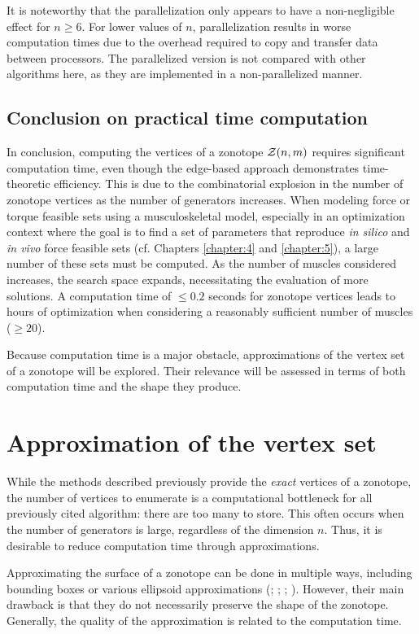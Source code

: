 It is noteworthy that the parallelization only appears to have a non-negligible effect for $n\geq 6$. For lower values of $n$, parallelization results in worse computation times due to the overhead required to copy and transfer data between processors. The parallelized version is not compared with other algorithms here, as they are implemented in a non-parallelized manner.

\subsection{Conclusion on practical time computation}
In conclusion, computing the vertices of a zonotope $\mathcal{Z}(n,m)$ requires significant computation time, even though the edge-based approach demonstrates time-theoretic efficiency. This is due to the combinatorial explosion in the number of zonotope vertices as the number of generators increases. When modeling force or torque feasible sets using a musculoskeletal model, especially in an optimization context where the goal is to find a set of parameters that reproduce \emph{in silico} and \emph{in vivo} force feasible sets (cf. Chapters \ref{chapter:4} and \ref{chapter:5}), a large number of these sets must be computed. As the number of muscles considered increases, the search space expands, necessitating the evaluation of more solutions. A computation time of $\leq 0.2$ seconds for zonotope vertices leads to hours of optimization when considering a reasonably sufficient number of muscles ($\geq 20$).

Because computation time is a major obstacle, approximations of the vertex set of a zonotope will be explored. Their relevance will be assessed in terms of both computation time and the shape they produce.

\section{Approximation of the vertex set}
\label{sec:approximation_of_vertices_zonotope}
While the methods described previously provide the \emph{exact} vertices of a zonotope, the number of vertices to enumerate is a computational bottleneck for all previously cited algorithm: there are too many to store. This often occurs when the number of generators is large, regardless of the dimension $n$. Thus, it is desirable to reduce computation time through approximations.

Approximating the surface of a zonotope can be done in multiple ways, including bounding boxes or various ellipsoid approximations (\cite{cernyGoffinAlgorithmZonotopes2012}; \cite{gasmannScalableZonotopeEllipsoidConversions2020}; \cite{kousikEllipsotopesCombiningEllipsoids2021}; \cite{henkLownerJohnEllipsoids2012}). However, their main drawback is that they do not necessarily preserve the shape of the zonotope. Generally, the quality of the approximation is related to the computation time.

